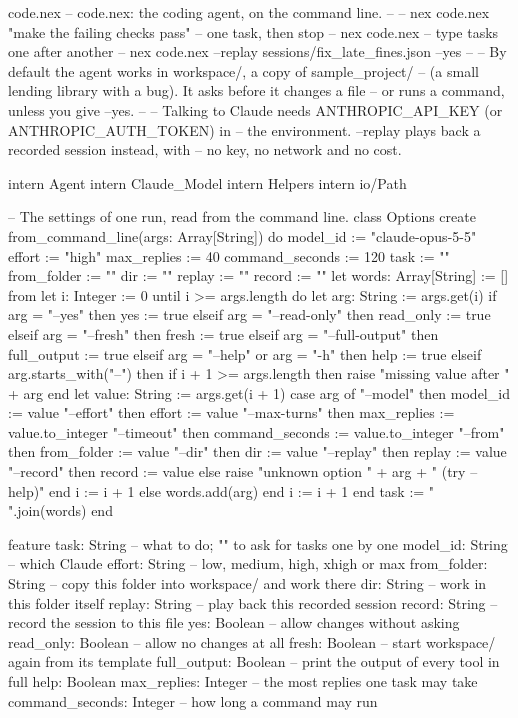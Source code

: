 \begin{newfile}{code.nex}
-- code.nex: the coding agent, on the command line.
--
--   nex code.nex "make the failing checks pass"     -- one task, then stop
--   nex code.nex                                    -- type tasks one after another
--   nex code.nex --replay sessions/fix_late_fines.json --yes
--
-- By default the agent works in workspace/, a copy of sample_project/
-- (a small lending library with a bug). It asks before it changes a file
-- or runs a command, unless you give --yes.
--
-- Talking to Claude needs ANTHROPIC_API_KEY (or ANTHROPIC_AUTH_TOKEN) in
-- the environment. --replay plays back a recorded session instead, with
-- no key, no network and no cost.

intern Agent
intern Claude_Model
intern Helpers
intern io/Path

-- The settings of one run, read from the command line.
class Options
create
  from_command_line(args: Array[String]) do
    model_id := "claude-opus-5-5"
    effort := "high"
    max_replies := 40
    command_seconds := 120
    task := ""
    from_folder := ""
    dir := ""
    replay := ""
    record := ""
    let words: Array[String] := []
    from
      let i: Integer := 0
    until
      i >= args.length
    do
      let arg: String := args.get(i)
      if arg = "--yes" then
        yes := true
      elseif arg = "--read-only" then
        read_only := true
      elseif arg = "--fresh" then
        fresh := true
      elseif arg = "--full-output" then
        full_output := true
      elseif arg = "--help" or arg = "-h" then
        help := true
      elseif arg.starts_with("--") then
        if i + 1 >= args.length then
          raise "missing value after " + arg
        end
        let value: String := args.get(i + 1)
        case arg of
          "--model"     then model_id := value
          "--effort"    then effort := value
          "--max-turns" then max_replies := value.to_integer
          "--timeout"   then command_seconds := value.to_integer
          "--from"      then from_folder := value
          "--dir"       then dir := value
          "--replay"    then replay := value
          "--record"    then record := value
          else raise "unknown option " + arg + " (try --help)"
        end
        i := i + 1
      else
        words.add(arg)
      end
      i := i + 1
    end
    task := " ".join(words)
  end

feature
  task: String         -- what to do; "" to ask for tasks one by one
  model_id: String     -- which Claude
  effort: String       -- low, medium, high, xhigh or max
  from_folder: String  -- copy this folder into workspace/ and work there
  dir: String          -- work in this folder itself
  replay: String       -- play back this recorded session
  record: String       -- record the session to this file
  yes: Boolean         -- allow changes without asking
  read_only: Boolean   -- allow no changes at all
  fresh: Boolean       -- start workspace/ again from its template
  full_output: Boolean -- print the output of every tool in full
  help: Boolean
  max_replies: Integer -- the most replies one task may take
  command_seconds: Integer  -- how long a command may run


\end{newfile}
